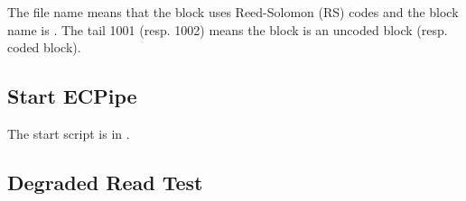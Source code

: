 \documentclass[letterpaper,12pt]{article}
\begin{document}
%


The file name  means that the block uses Reed-Solomon
(RS) codes and the block name is .  The tail 1001 (resp. 1002)
means the block is an uncoded block (resp. coded block).


\subsection{Start ECPipe}

The start script is in .

\begin{center}
\noindent{}
\end{center}

\subsection{Degraded Read Test}
\end{document}
